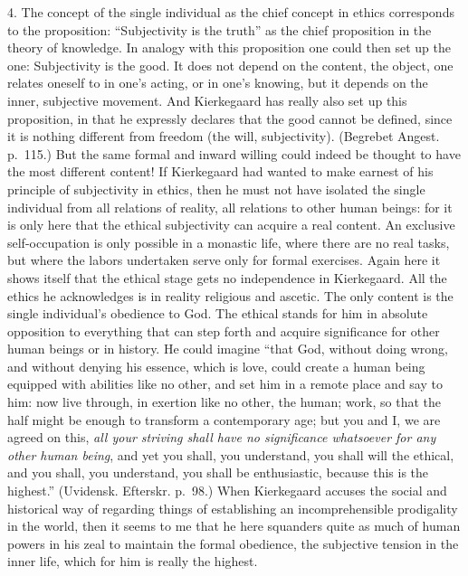 \documentclass[12pt,a4paper]{book}
\newcommand{\opage}[1]{\marginnote{\footnotesize\textit{[#1]}}}
\begin{document}
4. The concept of the single individual as the chief concept in ethics
corresponds to the proposition: ``Subjectivity is the truth'' as the chief
proposition in the theory of knowledge. In analogy with this proposition
one could then set up the one: Subjectivity is the good. It does not
depend on the content, the object, one relates oneself to in one's acting,
or in one's knowing, but it depends on the inner, subjective movement. And
Kierkegaard has really also set up this proposition, in that he expressly
declares that the good cannot be defined, since it is nothing different
from freedom (the will, subjectivity).
(Begrebet Angest. p.~115.) But the same formal and inward willing could
indeed be thought to have the most different content! If Kierkegaard had
wanted to make earnest of his principle of subjectivity in ethics, then he
must not have isolated the single individual from all relations of
reality, all relations to other human beings: for it is only here that the
ethical subjectivity can acquire a real content. An exclusive
self-occupation is only possible in a monastic life, where there are no
real tasks, but where the labors undertaken serve only for formal
exercises. Again
\opage{104}here it shows itself that the ethical stage gets no
independence in Kierkegaard. All the ethics he acknowledges is in reality
religious and ascetic. The only content is the single individual's
obedience to God. The ethical stands for him in absolute opposition to
everything that can step forth and acquire significance for other human
beings or in history. He could imagine ``that God, without doing wrong,
and without denying his essence, which is love, could create a human being
equipped with abilities like no other, and set him in a remote place and
say to him: now live through, in exertion like no other, the human; work,
so that the half might be enough to transform a contemporary age; but you
and I, we are agreed on this, \textit{all your striving shall have no
significance whatsoever for any other human being}, and yet you shall, you
understand, you shall will the ethical, and you shall, you understand, you
shall be enthusiastic, because this is the highest.''
(Uvidensk. Efterskr. p.~98.) When Kierkegaard accuses the social and
historical way of regarding things of establishing an incomprehensible
prodigality in the world, then it seems to me that he here squanders quite
as much of human powers in his zeal to maintain the formal obedience, the
subjective tension in the inner life, which for him is really the highest.
\end{document}
